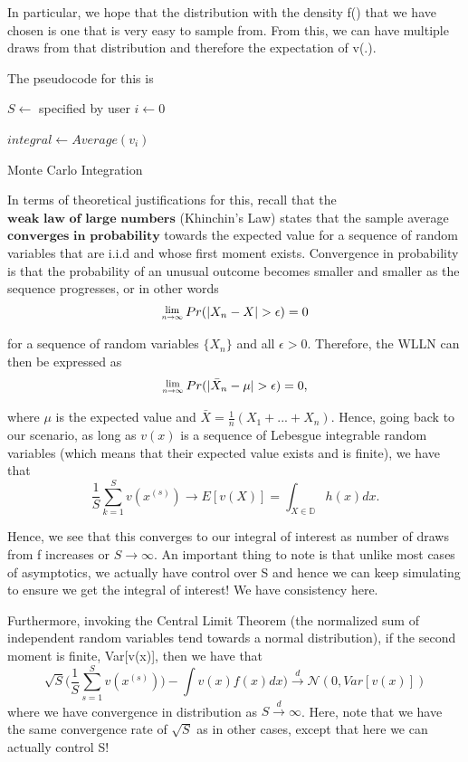 \documentclass[twoside]{article}
\newcommand{\Lim}[1]{\raisebox{0.5ex}{\scalebox{0.8}{$\displaystyle \lim_{#1}\;$}}}
\begin{document}
In particular, we hope that the distribution with the density f() that we have chosen is one that is very easy to sample from. From this, we can have multiple draws from that distribution and therefore the expectation of v(.). 

The pseudocode for this is

\begin{algorithm}
\DontPrintSemicolon
{}
$S \gets$ specified by user\;
$i \gets 0$\;

$integral \gets Average(v_i)$

\;
\caption{{\sc Monte Carlo Integration}}

\end{algorithm}

In terms of theoretical justifications for this, recall that the $\textbf{weak law of large numbers}$ (Khinchin's Law) states that the sample average $\textbf{converges in probability}$ towards the expected value for a sequence of random variables that are i.i.d and whose first moment exists. Convergence in probability is that the probability of an unusual outcome becomes smaller and smaller as the sequence progresses, or in other words
$$
\Lim{n \rightarrow \infty}Pr(|X_n - X| > \epsilon) = 0
$$

for a sequence of random variables $\{X_n\}$ and all $\epsilon > 0$. Therefore, the WLLN can then be expressed as
$$
\Lim{n \rightarrow \infty}Pr(|\bar{X}_n - \mu| > \epsilon) = 0,
$$

where $\mu$ is the expected value and $\bar{X} = \frac{1}{n}(X_1 + ... + X_n)$. Hence, going back to our scenario, as long as $v(x)$ is a sequence of Lebesgue integrable random variables (which means that their expected value exists and is finite), we have that
$$
\frac{1}{S}\sum_{k=1}^Sv(x^{(s)}) \rightarrow E[v(X)] = \int_{X \in \mathbb{D}}h(x)dx.
$$

Hence, we see that this converges to our integral of interest as number of draws from f increases or $S \rightarrow \infty$. An important thing to note is that unlike most cases of asymptotics, we actually have control over S and hence we can keep simulating to ensure we get the integral of interest! We have consistency here. 

Furthermore, invoking the Central Limit Theorem (the normalized sum of independent random variables tend towards a normal distribution), if the second moment is finite, Var[v(x)], then we have that
$$
\sqrt{S}\big(\frac{1}{S}\sum_{s=1}^Sv(x^{(s)})\big) - \int v(x)f(x)dx) \xrightarrow{d} \mathcal{N}(0, Var[v(x)])
$$
where we have convergence in distribution as $S \xrightarrow{d} \infty$. Here, note that we have the same convergence rate of $\sqrt{S}$ as in other cases, except that here we can actually control S! 
\end{document}

